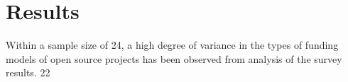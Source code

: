 \section{Results}

Within a sample size of 24, a high degree of variance in the types of funding models of open source projects has been observed from analysis of the survey results. 22%
